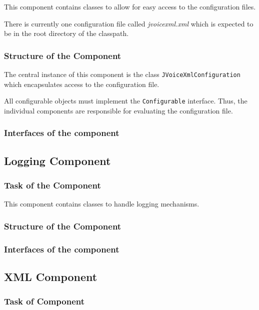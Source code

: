 \documentclass[11pt,a4paper]{article}
\begin{document}
This component contains classes to allow for easy access to the configuration
files.

There is currently one configuration file called \emph{jvoicexml.xml}
which is expected to be in the root directory of the classpath.

\subsubsection{Structure of the Component}

The central instance of this component is the class
\texttt{JVoiceXml\-Configurat\-ion} which encapsulates access to the
configuration file.

All configurable objects must implement the \texttt{Configurable}
interface. Thus, the individual components are responsible for
evaluating the configuration file.

\subsubsection{Interfaces of the component}

\subsection{Logging Component}
\label{sec:logging-component}

\subsubsection{Task of the Component}

This component contains classes to handle logging mechanisms.

\subsubsection{Structure of the Component}

\subsubsection{Interfaces of the component}

\subsection{XML Component}
\label{sec:xml-component}

\subsubsection{Task of Component}
\end{document}
